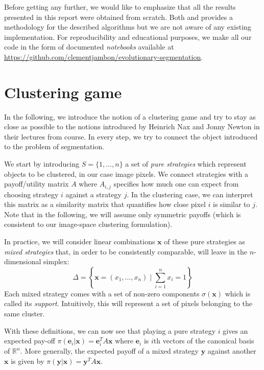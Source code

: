 \documentclass[11pt,a4paper]{article}
\begin{document}
Before getting any further, we would like to emphasize that all the results presented in this report were obtained from scratch. Both \cite{bulo-thesis} and \cite{game-clustering} provides a methodology for the described algorithms but we are not aware of any existing implementation. For reproducibility and educational purposes, we make all our code in the form of documented \textit{notebooks} available at \url{https://github.com/clementjambon/evolutionary-segmentation}. 

\section{Clustering game}
\label{sec:cluster-game}

In the following, we introduce the notion of a clustering game and try to stay as close as possible to the notions introduced by Heinrich Nax and Jonny Newton in their lectures from course\cite{course-gt}. In every step, we try to connect the object introduced to the problem of segmentation.

We start by introducing $S=\{1, \ldots, n\}$ a set of \textit{pure strategies} which represent objects to be clustered, in our case image pixels. We connect strategies with a payoff/utility matrix $A$ where $A_{i, j}$ specifies how much one can expect from choosing strategy $i$ against a strategy $j$. In the clustering case, we can interpret this matrix as a similarity matrix that quantifies how close pixel $i$ is similar to $j$. Note that in the following, we will assume only symmetric payoffs (which is consistent to our image-space clustering formulation). 

In practice, we will consider linear combinations $\mathbf{x}$ of these pure strategies as \textit{mixed strategies} that, in order to be consistently comparable, will leave in the $n$-dimensional simplex:
\begin{equation}
    \Delta = \left\{\mathbf{x} = (x_1, \ldots, x_n)\; |\; \sum_{i=1}^n x_i = 1\right\}
\end{equation}
Each mixed strategy comes with a set of non-zero components $\sigma(\mathbf{x})$ which is called its \textit{support}. Intuitively, this will represent a set of pixels belonging to the same cluster. 

With these definitions, we can now see that playing a pure strategy $i$ gives an expected pay-off $\pi(\mathbf{e}_i|\mathbf{x})=\mathbf{e}_i^TA\mathbf{x}$ where $\mathbf{e}_i$ is $i$th vectors of the canonical basis of $\mathbb{R}^n$. More generally, the expected payoff of a mixed strategy $\mathbf{y}$ against another $\mathbf{x}$ is given by $\pi(\mathbf{y}|\mathbf{x})=\mathbf{y}^TA\mathbf{x}$.
\end{document}
